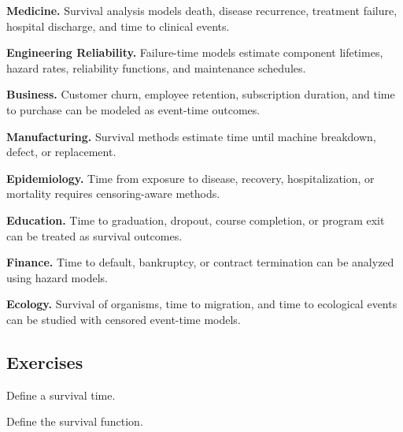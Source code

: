 \begin{applicationbox}

\textbf{Medicine.}
Survival analysis models death, disease recurrence, treatment failure,
hospital discharge, and time to clinical events.

\medskip

\textbf{Engineering Reliability.}
Failure-time models estimate component lifetimes, hazard rates,
reliability functions, and maintenance schedules.

\medskip

\textbf{Business.}
Customer churn, employee retention, subscription duration, and time to
purchase can be modeled as event-time outcomes.

\medskip

\textbf{Manufacturing.}
Survival methods estimate time until machine breakdown, defect, or
replacement.

\medskip

\textbf{Epidemiology.}
Time from exposure to disease, recovery, hospitalization, or mortality
requires censoring-aware methods.

\medskip

\textbf{Education.}
Time to graduation, dropout, course completion, or program exit can be
treated as survival outcomes.

\medskip

\textbf{Finance.}
Time to default, bankruptcy, or contract termination can be analyzed
using hazard models.

\medskip

\textbf{Ecology.}
Survival of organisms, time to migration, and time to ecological events
can be studied with censored event-time models.

\end{applicationbox}

\subsection{Exercises}
\label{subsec:survival-exercises}

\begin{exercise}[1]
Define a survival time.
\end{exercise}

\begin{exercise}[1]
Define the survival function.
\end{exercise}

